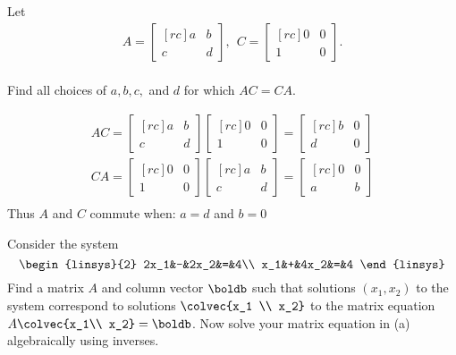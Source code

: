 \ii Let 
\begin{eqnarray*}
A = 
\begin{bmatrix}[rc]
a&b\\
c&d
\end{bmatrix} 
, \hspace{5pt}
C = 
\begin{bmatrix}[rc]
0&0\\
1&0
\end{bmatrix}.
\end{eqnarray*}
\\
Find all choices of $a,b,c,$ and $d$ for which $AC=CA$. 
\\
\begin{solution}
\begin{eqnarray*}
AC =
\begin{bmatrix}[rc]
a&b\\
c&d
\end{bmatrix}
\begin{bmatrix}[rc]
0&0\\
1&0
\end{bmatrix}
=
\begin{bmatrix}[rc]
b&0\\
d&0
\end{bmatrix}\\
CA = 
\begin{bmatrix}[rc]
0&0\\
1&0
\end{bmatrix} 
\begin{bmatrix}[rc]
a&b\\
c&d
\end{bmatrix} 
=
\begin{bmatrix}[rc]
0&0\\
a&b
\end{bmatrix}\\
\end{eqnarray*}
Thus $A$ and $C$ commute when: $a = d$ and $b = 0$
\end{solution}
\ii Consider the system 
\[
\begin{linsys}{2}
2x_1&-&2x_2&=&4\\
x_1&+&4x_2&=&4
\end{linsys}
\]
\bb
\ii Find a matrix $A$ and column vector $\boldb$ such that solutions $(x_1,x_2)$ to the system correspond to solutions $\colvec{x_1 \\ x_2}$ to the matrix equation $A\colvec{x_1\\ x_2}=\boldb$. 
\ii Now solve your matrix equation in (a) algebraically using inverses. 
\ee
\ \\

